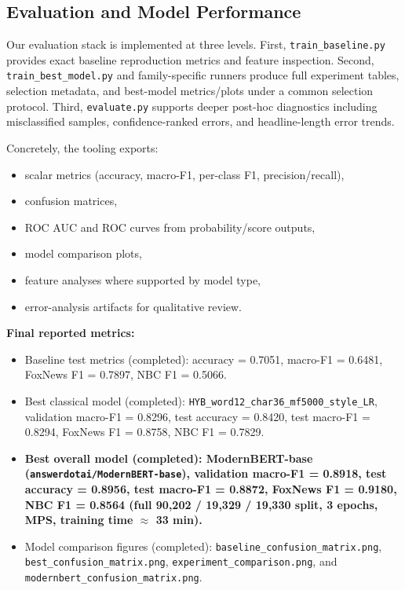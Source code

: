 \documentclass[10pt]{article}
\begin{document}
\subsection{Evaluation and Model Performance}
Our evaluation stack is implemented at three levels. First, \texttt{train\_baseline.py} provides exact baseline reproduction metrics and feature inspection. Second, \texttt{train\_best\_model.py} and family-specific runners produce full experiment tables, selection metadata, and best-model metrics/plots under a common selection protocol. Third, \texttt{evaluate.py} supports deeper post-hoc diagnostics including misclassified samples, confidence-ranked errors, and headline-length error trends.

Concretely, the tooling exports:
\begin{itemize}
    \item scalar metrics (accuracy, macro-F1, per-class F1, precision/recall),
    \item confusion matrices,
    \item ROC AUC and ROC curves from probability/score outputs,
    \item model comparison plots,
    \item feature analyses where supported by model type,
    \item error-analysis artifacts for qualitative review.
\end{itemize}

\textbf{Final reported metrics:}
\begin{itemize}
    \item Baseline test metrics (completed): accuracy = 0.7051, macro-F1 = 0.6481, FoxNews F1 = 0.7897, NBC F1 = 0.5066.
    \item Best classical model (completed): \texttt{HYB\_word12\_char36\_mf5000\_style\_LR}, validation macro-F1 = 0.8296, test accuracy = 0.8420, test macro-F1 = 0.8294, FoxNews F1 = 0.8758, NBC F1 = 0.7829.
    \item \textbf{Best overall model (completed): ModernBERT-base (\texttt{answerdotai/ModernBERT-base}), validation macro-F1 = 0.8918, test accuracy = 0.8956, test macro-F1 = 0.8872, FoxNews F1 = 0.9180, NBC F1 = 0.8564 (full 90{,}202 / 19{,}329 / 19{,}330 split, 3 epochs, MPS, training time $\approx$ 33 min).}
    \item Model comparison figures (completed): \texttt{baseline\_confusion\_matrix.png}, \texttt{best\_confusion\_matrix.png}, \texttt{experiment\_comparison.png}, and \texttt{modernbert\_confusion\_matrix.png}.
\end{itemize}
\end{document}
